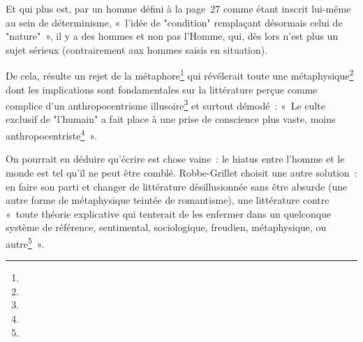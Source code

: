 \documentclass[12pt, a4paper]{article}
\begin{document}
Et qui plus est, par un homme défini à la page~27 comme étant inscrit lui-même au sein de déterminisme, «~l'idée de "condition" remplaçant désormais celui de "nature"~», il y a des hommes et non pas l'Homme, qui, dès lors n'est plus un sujet sérieux (contrairement aux hommes saisis en situation).

De cela, résulte un rejet de la métaphore\footnote{} qui révélerait toute une métaphysique\footnote{} dont les implications sont fondamentales sur la littérature perçue comme complice d'un anthropocentrisme illusoire\footnote{} et surtout démodé~: «~Le culte exclusif de "l'humain" a fait place à une prise de conscience plus vaste, moins anthropocentriste\footnote{}~».


On pourrait en déduire qu'écrire est chose vaine~: le hiatus entre l'homme et le monde est tel qu'il ne peut être comblé. Robbe-Grillet choisit une autre solution~: en faire son parti et changer de littérature désillusionnée sans être absurde (une autre forme de métaphysique teintée de romantisme), une littérature contre «~toute théorie explicative qui tenterait de les enfermer dans un quelconque système de référence, sentimental, sociologique, freudien, métaphysique, ou autre\footnote{}~».
\end{document}
